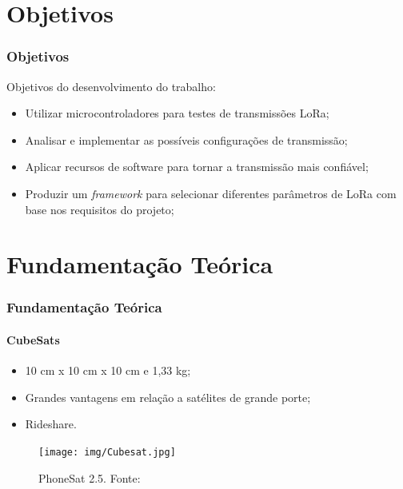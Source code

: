 \documentclass[aspectratio=169]{beamer}
\begin{document}
\section{Objetivos}

\begin{frame}
\frametitle{Objetivos}

Objetivos do desenvolvimento do trabalho:

\begin{itemize}
    \item Utilizar microcontroladores para testes de transmissões LoRa;
    \item Analisar e implementar as possíveis configurações de transmissão;
    \item Aplicar recursos de software para tornar a transmissão mais confiável;
    \item Produzir um \emph{framework} para selecionar diferentes parâmetros de LoRa com base nos requisitos do projeto;
\end{itemize}

\end{frame}

\section{Fundamentação Teórica}

\begin{frame}
\frametitle{Fundamentação Teórica}
\framesubtitle{CubeSats}

\begin{itemize}
    \item 10 cm x 10 cm x 10 cm e 1,33 kg;
    \item Grandes vantagens em relação a satélites de grande porte;
    \item Rideshare.
\end{itemize}

\begin{figure}
  \centering
  \texttt{[image: img/Cubesat.jpg]}
  \caption{PhoneSat 2.5. Fonte: }
\end{figure}

\end{frame}
\end{document}
